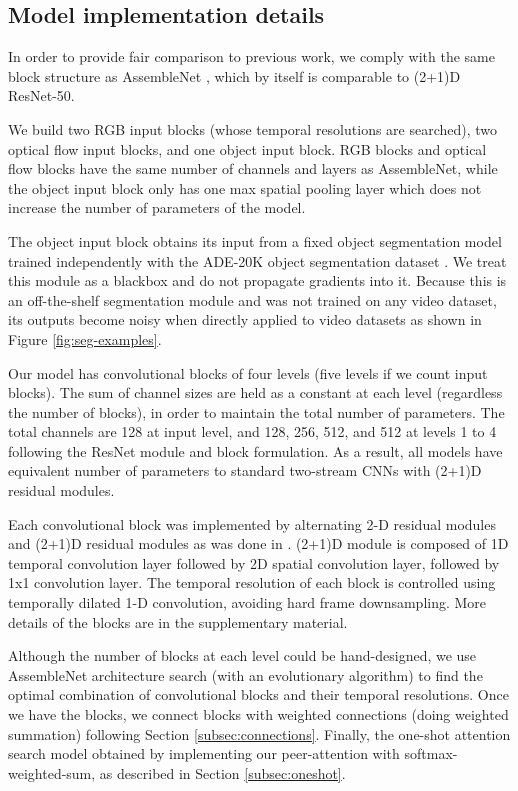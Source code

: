 \documentclass[runningheads]{llncs}
\begin{document}
\subsection{Model implementation details}
\label{subsec:details}

In order to provide fair comparison to previous work, we comply with the same block structure as AssembleNet \cite{ryoo2019assemblenet}, which by itself is comparable to (2+1)D ResNet-50.

We build two RGB input blocks (whose temporal resolutions are searched), two optical flow input blocks, and one object input block. RGB blocks and optical flow blocks have the same number of channels and layers as AssembleNet, while the object input block only has one max spatial pooling layer which does not increase the number of parameters of the model. 

The object input block obtains its input from a fixed object segmentation model trained independently with the ADE-20K object segmentation dataset \cite{ade20k}. We treat this module as a blackbox and do not propagate gradients into it.
Because this is an off-the-shelf segmentation module and was not trained on any video dataset, its outputs become noisy when directly applied to video datasets as shown in Figure \ref{fig:seg-examples}.

Our model has convolutional blocks of four levels (five levels if we count input blocks). The sum of channel sizes are held as a constant at each level (regardless the number of blocks), in order to maintain the total number of parameters. The total channels are 128 at input level, and 128, 256, 512, and 512 at levels 1 to 4 following the ResNet module and block formulation. As a result, all models have equivalent number of parameters to standard two-stream CNNs with (2+1)D residual modules.

Each convolutional block was implemented by alternating 2-D residual modules and (2+1)D residual modules as was done in \cite{tran2018closer,ryoo2019assemblenet}. (2+1)D module is composed of 1D temporal convolution layer followed by 2D spatial convolution layer, followed by 1x1 convolution layer. The temporal resolution of each block is controlled using temporally dilated 1-D convolution, avoiding hard frame downsampling. More details of the blocks are in the supplementary material.

Although the number of blocks at each level could be hand-designed, we use AssembleNet architecture search (with an evolutionary algorithm) to find the optimal combination of convolutional blocks and their temporal resolutions. Once we have the blocks, we connect blocks with weighted connections (doing weighted summation) following Section \ref{subsec:connections}. Finally, the one-shot attention search model obtained by implementing our peer-attention with softmax-weighted-sum, as described in Section \ref{subsec:oneshot}.
\end{document}
